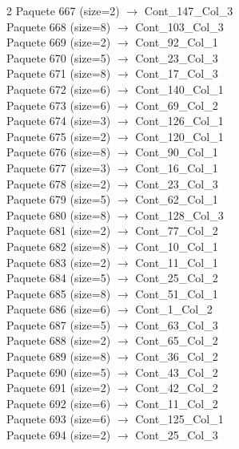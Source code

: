 \begin{multicols}{2}
Paquete 667 (size=2) $\rightarrow$ Cont\_147\_Col\_3\\
Paquete 668 (size=8) $\rightarrow$ Cont\_103\_Col\_3\\
Paquete 669 (size=2) $\rightarrow$ Cont\_92\_Col\_1\\
Paquete 670 (size=5) $\rightarrow$ Cont\_23\_Col\_3\\
Paquete 671 (size=8) $\rightarrow$ Cont\_17\_Col\_3\\
Paquete 672 (size=6) $\rightarrow$ Cont\_140\_Col\_1\\
Paquete 673 (size=6) $\rightarrow$ Cont\_69\_Col\_2\\
Paquete 674 (size=3) $\rightarrow$ Cont\_126\_Col\_1\\
Paquete 675 (size=2) $\rightarrow$ Cont\_120\_Col\_1\\
Paquete 676 (size=8) $\rightarrow$ Cont\_90\_Col\_1\\
Paquete 677 (size=3) $\rightarrow$ Cont\_16\_Col\_1\\
Paquete 678 (size=2) $\rightarrow$ Cont\_23\_Col\_3\\
Paquete 679 (size=5) $\rightarrow$ Cont\_62\_Col\_1\\
Paquete 680 (size=8) $\rightarrow$ Cont\_128\_Col\_3\\
Paquete 681 (size=2) $\rightarrow$ Cont\_77\_Col\_2\\
Paquete 682 (size=8) $\rightarrow$ Cont\_10\_Col\_1\\
Paquete 683 (size=2) $\rightarrow$ Cont\_11\_Col\_1\\
Paquete 684 (size=5) $\rightarrow$ Cont\_25\_Col\_2\\
Paquete 685 (size=8) $\rightarrow$ Cont\_51\_Col\_1\\
Paquete 686 (size=6) $\rightarrow$ Cont\_1\_Col\_2\\
Paquete 687 (size=5) $\rightarrow$ Cont\_63\_Col\_3\\
Paquete 688 (size=2) $\rightarrow$ Cont\_65\_Col\_2\\
Paquete 689 (size=8) $\rightarrow$ Cont\_36\_Col\_2\\
Paquete 690 (size=5) $\rightarrow$ Cont\_43\_Col\_2\\
Paquete 691 (size=2) $\rightarrow$ Cont\_42\_Col\_2\\
Paquete 692 (size=6) $\rightarrow$ Cont\_11\_Col\_2\\
Paquete 693 (size=6) $\rightarrow$ Cont\_125\_Col\_1\\
Paquete 694 (size=2) $\rightarrow$ Cont\_25\_Col\_3\\

\end{multicols}
